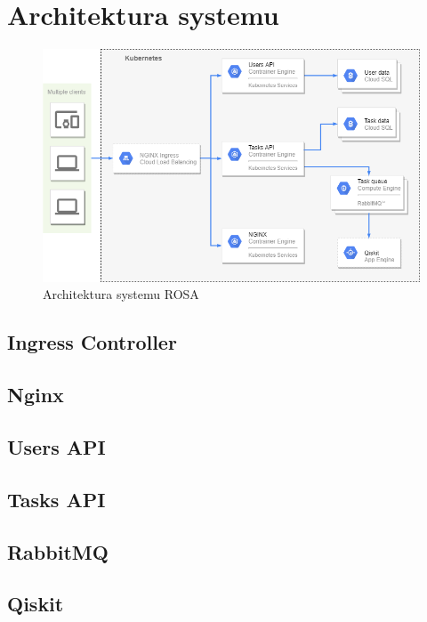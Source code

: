 \newpage
\chapter{Architektura systemu}
\begin{figure}[!ht]
    \centering
    \includegraphics[width=\textwidth]{images/RSO_arch.png}
    \caption{Architektura systemu ROSA}
    \label{fig:sys_arch}
\end{figure}
\section{Ingress Controller}
\lipsum[1]
\section{Nginx}
\lipsum[1]
\section{Users API}
\lipsum[1]
\section{Tasks API}
\lipsum[1]
\section{RabbitMQ}
\lipsum[1]
\section{Qiskit}
\lipsum[1]
